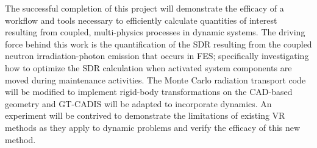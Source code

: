 
The successful completion of this project will demonstrate the efficacy of a workflow and tools
necessary to efficiently calculate quantities of interest resulting from
coupled, multi-physics processes in dynamic systems.  
The driving force behind this work is the quantification of the
SDR resulting from the coupled neutron
irradiation-photon emission that occurs in FES;
specifically investigating how to optimize the SDR calculation when %
activated system components are moved during maintenance activities.
The Monte Carlo radiation transport code will
be modified to implement rigid-body transformations on the CAD-based geometry
and GT-CADIS will be adapted to
incorporate dynamics.  An experiment will be contrived to demonstrate the
limitations of existing VR methods as they apply to dynamic problems and verify
the efficacy of this new method.  

